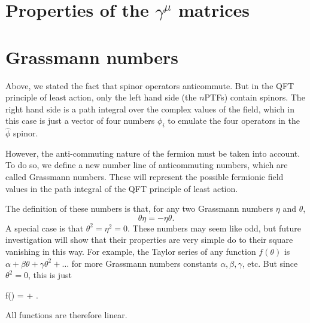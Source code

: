 \chapter{Properties of the $\gamma^\mu$ matrices}
\label{app:gamma}
\chapter{Grassmann numbers}
\label{app:grassmann}
Above, we stated the fact that spinor operators anticommute. But in the QFT principle of least action, only the left hand side (the $n$PTFs) contain spinors. The right hand side is a path integral over the complex values of the field, which in this case is just a vector of four numbers $\phi_i$ to emulate the four operators in the $\hat \phi$ spinor.

However, the anti-commuting nature of the fermion must be taken into account. To do so, we define a new number line of anticommuting numbers, which are called Grassmann numbers. These will represent the possible fermionic field values in the path integral of the QFT principle of least action.

The definition of these numbers is that, for any two Grassmann numbers $\eta$ and $\theta$,
\begin{equation}
  \theta \eta = -\eta \theta.
\end{equation}
A special case is that $\theta^2 = \eta^2 = 0$. These numbers may seem like odd, but future investigation will show that their properties are very simple do to their square vanishing in this way. For example, the Taylor series of any function $f(\theta)$ is $\alpha + \beta\theta + \gamma\theta^2 + \dots$ for more Grassmann numbers constants $\alpha,\beta,\gamma$, etc. But since $\theta^2 = 0$, this is just 
\begin{e}
  f(\theta) = \alpha +  \beta\theta.
\end{e}
All functions are therefore linear.

